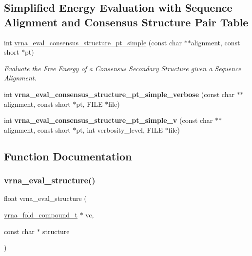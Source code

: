 \subsection*{Simplified Energy Evaluation with Sequence Alignment and Consensus Structure Pair Table}
\begin{DoxyCompactItemize}
\item 
int \mbox{\hyperlink{group__eval_gabbb4d2a7aa324ec9cce8f47ce61ab8af}{vrna\+\_\+eval\+\_\+consensus\+\_\+structure\+\_\+pt\+\_\+simple}} (const char $\ast$$\ast$alignment, const short $\ast$pt)
\begin{DoxyCompactList}\small\item\em Evaluate the Free Energy of a Consensus Secondary Structure given a Sequence Alignment. \end{DoxyCompactList}\item 
\mbox{\label{group__eval_ga2769e4369d023ad2d5c5f4d2ee825c23}} 
int {\bfseries vrna\+\_\+eval\+\_\+consensus\+\_\+structure\+\_\+pt\+\_\+simple\+\_\+verbose} (const char $\ast$$\ast$alignment, const short $\ast$pt, F\+I\+LE $\ast$file)
\item 
\mbox{\label{group__eval_gaf2d227b3d54bf9b693a3df52faf5e2e4}} 
int {\bfseries vrna\+\_\+eval\+\_\+consensus\+\_\+structure\+\_\+pt\+\_\+simple\+\_\+v} (const char $\ast$$\ast$alignment, const short $\ast$pt, int verbosity\+\_\+level, F\+I\+LE $\ast$file)
\end{DoxyCompactItemize}


\subsection{Function Documentation}
\mbox{\label{group__eval_ga58f199f1438d794a265f3b27fc8ea631}} 
\subsubsection{\texorpdfstring{vrna\_eval\_structure()}{vrna\_eval\_structure()}}
{\footnotesize\ttfamily float vrna\+\_\+eval\+\_\+structure (\begin{DoxyParamCaption}\item[{\mbox{\hyperlink{group__fold__compound_ga1b0cef17fd40466cef5968eaeeff6166}{vrna\+\_\+fold\+\_\+compound\+\_\+t}} $\ast$}]{vc,  }\item[{const char $\ast$}]{structure }\end{DoxyParamCaption})}



